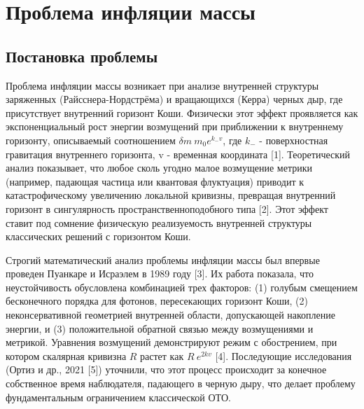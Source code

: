 \chapter{Проблема инфляции массы}\label{ch:3}


\section{Постановка проблемы}\label{sec:3.1}

Проблема инфляции массы возникает при анализе внутренней структуры заряженных (Райсснера-Нордстрёма) и вращающихся (Керра) черных дыр, где присутствует внутренний горизонт Коши. Физически этот эффект проявляется как экспоненциальный рост энергии возмущений при приближении к внутреннему горизонту, описываемый соотношением \(\delta m ~ m_0 e^{k_-v}\), где \(k_-\) - поверхностная гравитация внутреннего горизонта, v - временная координата [1]. Теоретический анализ показывает, что любое сколь угодно малое возмущение метрики (например, падающая частица или квантовая флуктуация) приводит к катастрофическому увеличению локальной кривизны, превращая внутренний горизонт в сингулярность пространственноподобного типа [2]. Этот эффект ставит под сомнение физическую реализуемость внутренней структуры классических решений с горизонтом Коши.

Строгий математический анализ проблемы инфляции массы был впервые проведен Пуанкаре и Исраэлем в 1989 году [3]. Их работа показала, что неустойчивость обусловлена комбинацией трех факторов: (1) голубым смещением бесконечного порядка для фотонов, пересекающих горизонт Коши, (2) неконсервативной геометрией внутренней области, допускающей накопление энергии, и (3) положительной обратной связью между возмущениями и метрикой. Уравнения возмущений демонстрируют режим с обострением, при котором скалярная кривизна \(R\) растет как \(R ~ e^{2kv}\) [4]. Последующие исследования (Ортиз и др., 2021 [5]) уточнили, что этот процесс происходит за конечное собственное время наблюдателя, падающего в черную дыру, что делает проблему фундаментальным ограничением классической ОТО.

